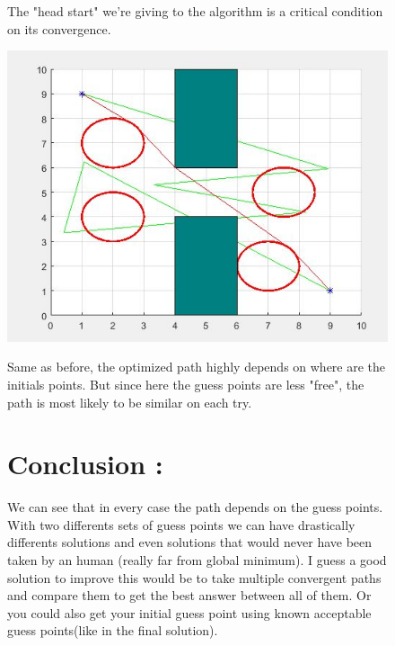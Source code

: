 \begin{figure}
\vspace{-10mm}

 The "head start" we're giving to the algorithm is a critical condition on its convergence.

\begin{center}
\includegraphics[width=1\textwidth]{final.JPG}
\end{center}

Same as before, the optimized path highly depends on where are the initials points. But since here the guess points are less "free", the path is most likely to be similar on each try.
\vspace{5mm}
\section{Conclusion :}
We can see that in every case the path depends on the guess points. With two differents sets of guess points we can have drastically differents solutions and even solutions that would never have been taken by an human (really far from global minimum). I guess a good solution to improve this would be to take multiple convergent paths and compare them to get the best answer between all of them. Or you could also get your initial guess point using known acceptable guess points(like in the final solution).


\end{figure}
